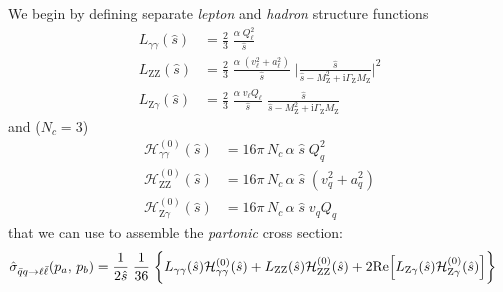 \documentclass[11pt]{article}
\begin{document}
We begin by defining separate \emph{lepton} and \emph{hadron} structure functions
\begin{align}
  L_{\gamma\gamma}(\hat{s})
  &=
  \frac{2}{3}\;\frac{\alpha\; Q_\ell^2}{\hat{s}}
  \\
  L_{\mathrm{Z}\mathrm{Z}}(\hat{s})
  &=
  \frac{2}{3}\;\frac{\alpha\; (v_\ell^2 + a_\ell^2)}{\hat{s}}\;
  \biggl\lvert\frac{\hat{s}}{\hat{s} - M_\mathrm{Z}^2 + \mathrm{i}\Gamma_\mathrm{Z}M_\mathrm{Z}}\biggr\rvert^2
  \\
  L_{\mathrm{Z}\gamma}(\hat{s})
  &=
  \frac{2}{3}\;\frac{\alpha\; v_\ell Q_\ell }{\hat{s}}\;
  \frac{\hat{s}}{\hat{s} - M_\mathrm{Z}^2 + \mathrm{i}\Gamma_\mathrm{Z}M_\mathrm{Z}}
\end{align}
and (\(N_c = 3\))
\begin{align}
  \mathcal{H}^{(0)}_{\gamma\gamma}(\hat{s})
  &=
  16\pi\,N_c \, \alpha\;\hat{s} \; Q_q^2
  \\
  \mathcal{H}^{(0)}_{\mathrm{Z}\mathrm{Z}}(\hat{s})
  &=
  16\pi\,N_c \, \alpha\;\hat{s} \; (v_q^2 + a_q^2)
  \\
  \mathcal{H}^{(0)}_{\mathrm{Z}\gamma}(\hat{s})
  &=
  16\pi\,N_c \, \alpha\;\hat{s} \; v_q Q_q
\end{align}
that we can use to assemble the \emph{partonic} cross section:
\begin{align}
  \hat{\sigma}_{\bar{q}q\to\ell\bar{\ell}}(p_a,\,p_b)
  &=
  \frac{1}{2\hat{s}} \; \frac{1}{36} \; \biggl\{
  L_{\gamma\gamma}(\hat{s}) \mathcal{H}^{(0)}_{\gamma\gamma}(\hat{s})
  + L_{\mathrm{Z}\mathrm{Z}}(\hat{s}) \mathcal{H}^{(0)}_{\mathrm{Z}\mathrm{Z}}(\hat{s})
  + 2\mathrm{Re}\Bigl[ L_{\mathrm{Z}\gamma}(\hat{s}) \mathcal{H}^{(0)}_{\mathrm{Z}\gamma}(\hat{s}) \Bigr]
  \biggr\}
\end{align}
\end{document}
